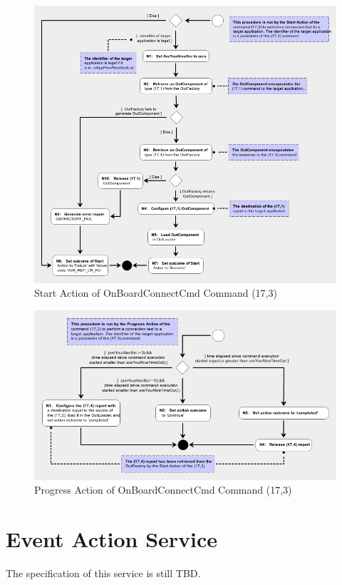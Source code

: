 \documentclass[a4paper,10pt]{article}
\let\stdsection\section
\renewcommand\section{\newpage\stdsection}
\begin{document}
\newpage
\begin{figure}[H]
 \centering
 \includegraphics[scale=0.415,keepaspectratio=true]{CrPsCmd17s3Start.png}
 \caption{Start Action of OnBoardConnectCmd Command (17,3)}
 \label{fig:Cmd17s3Start}
\end{figure}

\begin{figure}[H]
 \centering
 \includegraphics[scale=0.415,keepaspectratio=true]{CrPsCmd17s3Prgr.png}
 \caption{Progress Action of OnBoardConnectCmd Command (17,3)}
 \label{fig:Cmd17s3Prgr}
\end{figure}


\section{Event Action Service}\label{sec:serv19}
The specification of this service is still TBD.
\end{document}
